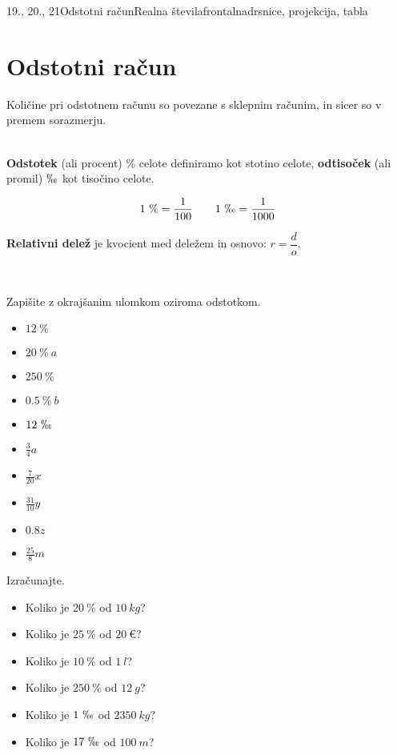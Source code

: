 \begin{priprava}{19., 20., 21}{}{Odstotni račun}{Realna števila}{frontalna}{drsnice, projekcija, tabla}
    
    \section{Odstotni račun}  
        
    Količine pri odstotnem računu so povezane s sklepnim računim, in sicer so v premem sorazmerju.

~\\
    \textbf{Odstotek} (ali procent) $\text{\%}$ celote definiramo kot stotino celote,
    \textbf{odtisoček} (ali promil) $\permil$ kot tisočino celote.

    $$ 1~\text{\%}=\dfrac{1}{100} \quad \quad {1~\permil=\dfrac{1}{1000}}$$



    \textbf{Relativni delež} je kvocient med deležem in osnovo: $r=\dfrac{d}{o}$.



~~~\\

\begin{naloga}
    Zapišite z okrajšanim ulomkom oziroma odstotkom.
    \begin{itemize}
            \item $12~\%$ 
            \item $20~\%~a$ 
            \item $250~\%$ 
            \item $0.5~\%~b$ 
            \item $12~\permil$ 
            \item $\frac{3}{4}a$ 
            \item $\frac{7}{20}x$ 
            \item $\frac{31}{10}y$ 
            \item $0.8 z$ 
            \item $\frac{25}{8}m$
    \end{itemize}
\end{naloga}




\begin{naloga}
    Izračunajte.
    \begin{itemize}
            \item Koliko je $20~\%$ od $10~kg$? 
            \item Koliko je $25~\%$ od $20~€$? 
            \item Koliko je $10~\%$ od $1~l$? 
            \item Koliko je $250~\%$ od $12~g$? 
            \item Koliko je $1~\permil$ od $2350~kg$? 
            \item Koliko je $17~\permil$ od $100~m$? 
    \end{itemize}
\end{naloga}



\end{priprava}
